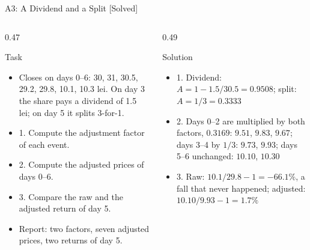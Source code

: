 \begin{frame}{A3: A Dividend and a Split [Solved]}
\itemsize{\footnotesize}
\begin{columns}[T]
\begin{column}{0.47\textwidth}
\begin{block}{Task}
\begin{itemize}
    \item Closes on days 0--6: 30, 31, 30.5, 29.2, 29.8, 10.1, 10.3 lei. On day 3 the share pays a dividend of 1.5 lei; on day 5 it splits 3-for-1.
    \item 1. Compute the adjustment factor of each event.
    \item 2. Compute the adjusted prices of days 0--6.
    \item 3. Compare the raw and the adjusted return of day 5.
    \item Report: two factors, seven adjusted prices, two returns of day 5.
\end{itemize}
\end{block}
\end{column}
\begin{column}{0.49\textwidth}
\begin{exampleblock}{Solution}
\begin{itemize}
    \item 1. Dividend: $A = 1 - 1.5/30.5 = 0.9508$; split: $A = 1/3 = 0.3333$
    \item 2. Days 0--2 are multiplied by both factors, $0.3169$: $9.51$, $9.83$, $9.67$; days 3--4 by $1/3$: $9.73$, $9.93$; days 5--6 unchanged: $10.10$, $10.30$
    \item 3. Raw: $10.1/29.8 - 1 = -66.1\%$, a fall that never happened; adjusted: $10.10/9.93 - 1 = 1.7\%$
\end{itemize}
\end{exampleblock}
\end{column}
\end{columns}
\end{frame}

